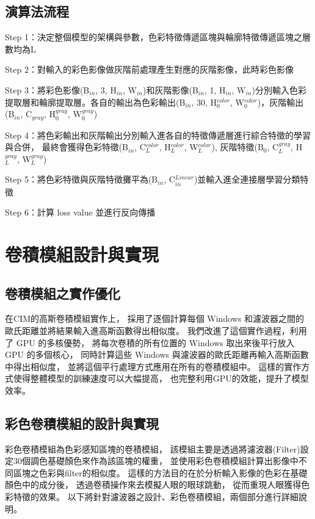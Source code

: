 \documentclass[class=NCU_thesis, crop=false]{standalone}
\begin{document}
\subsection{演算法流程}
Step 1：決定整個模型的架構與參數，色彩特徵傳遞區塊與輪廓特徵傳遞區塊之層數均為L

Step 2：對輸入的彩色影像做灰階前處理產生對應的灰階影像，此時彩色影像

Step 3：將彩色影像(B$_{in}$, 3, H$_{in}$, W$_{in}$)和灰階影像(B$_{in}$, 1, H$_{in}$, W$_{in}$)分別輸入色彩提取層和輪廓提取層。各自的輸出為色彩輸出(B$_{in}$, 30, H$^{color}_{0}$, W$^{color}_{0}$)，灰階輸出(B$_{in}$, C${_{gray}}$, H$^{gray}_{0}$, W$^{gray}_{0}$)

Step 4：將色彩輸出和灰階輸出分別輸入進各自的特徵傳遞層進行綜合特徵的學習與合併，
		最終會獲得色彩特徵(B$_{in}$, C$^{color}_{L}$, H$^{color}_{L}$, W$^{color}_{L}$), 灰階特徵(B$_{0}$, C$^{gray}_{L}$, H$^{gray}_{L}$, W$^{gray}_{L}$)

Step 5：將色彩特徵與灰階特徵攤平為(B$_{in}$, C$^{Linear}_{in}$)並輸入進全連接層學習分類特徵

Step 6：計算 loss value 並進行反向傳播

\pagebreak


\section{卷積模組設計與實現}
	\subsection{卷積模組之實作優化}
		在CIM的高斯卷積模組實作上，
		採用了逐個計算每個 Windows 和濾波器之間的歐氏距離並將結果輸入進高斯函數得出相似度。
		我們改進了這個實作過程，利用了 GPU 的多核優勢，
		將每次卷積的所有位置的 Windows 取出來後平行放入 GPU 的多個核心，
		同時計算這些 Windows 與濾波器的歐氏距離再輸入高斯函數中得出相似度，
		並將這個平行處理方式應用在所有的卷積模組中。
		這樣的實作方式使得整體模型的訓練速度可以大幅提高，
		也完整利用GPU的效能，提升了模型效率。

	\subsection{彩色卷積模組的設計與實現}
		彩色卷積模組為色彩感知區塊的卷積模組，
		該模組主要是透過將濾波器(Filter)設定30個調色基礎顏色來作為該區塊的權重，
		並使用彩色卷積模組計算出影像中不同區塊之色彩與filter的相似度。
		這樣的方法目的在於分析輸入影像的色彩在基礎顏色中的成分後，
		透過卷積操作來去模擬人眼的眼球跳動，
		從而重現人眼獲得色彩特徵的效果。
		以下將針對濾波器之設計、彩色卷積模組，兩個部分進行詳細說明。
		\pagebreak
\end{document}
